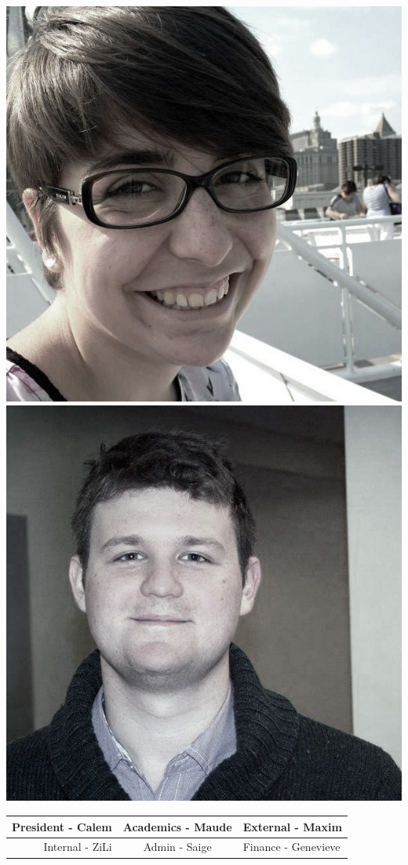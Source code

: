 \begin{center}
	\includegraphics[width=.35\textheight]{gfx/maudethumb.jpg}
	\includegraphics[width=.35\textheight]{gfx/maximthumb.jpg}
	\vspace{.5em}\newline
	 	\begin{tabular}{r|c|l}
	 		President - Calem & Academics - Maude & External - Maxim\\ \hline
	 		Internal - ZiLi & Admin - Saige & Finance - Genevieve\\ 
	 		

\end{tabular}
\end{center}
